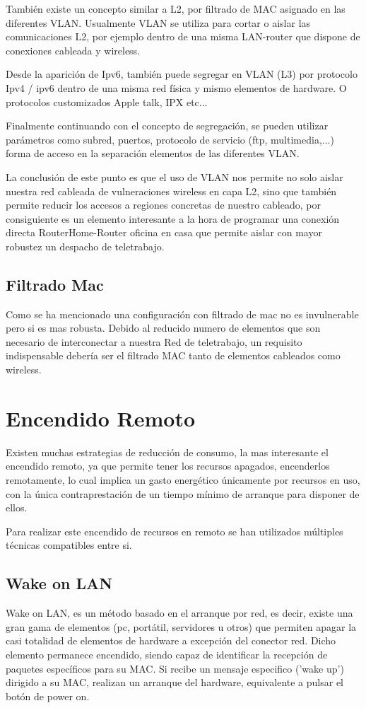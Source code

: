 También existe un concepto similar a L2, por filtrado de MAC asignado en las diferentes VLAN. Usualmente VLAN se utiliza para cortar o aislar las comunicaciones L2, por ejemplo dentro de una misma LAN-router que dispone de conexiones cableada y wireless.

Desde la aparición de Ipv6, también puede segregar en VLAN (L3) por protocolo Ipv4 / ipv6 dentro de una misma red física y mismo elementos de hardware. O protocolos customizados Apple talk, IPX etc...

Finalmente continuando con el concepto de segregación, se pueden utilizar parámetros como subred, puertos, protocolo de servicio (ftp, multimedia,...) forma de acceso en la separación elementos de las diferentes VLAN. 

La conclusión de este punto es que el uso de VLAN nos permite no solo aislar nuestra red cableada de vulneraciones wireless en capa L2, sino que también permite reducir los accesos a regiones concretas de nuestro cableado, por consiguiente es un elemento interesante a la hora de programar una conexión directa RouterHome-Router oficina en casa que permite aislar con mayor robustez un despacho de teletrabajo.

\subsection{Filtrado Mac}\label{S:vlan}
Como se ha mencionado una configuración con filtrado de mac no es invulnerable pero si es mas robusta. Debido al reducido numero de elementos que son necesario de interconectar a nuestra Red de teletrabajo, un requisito indispensable debería ser el filtrado MAC tanto de elementos cableados como wireless.

\section{Encendido Remoto}
Existen muchas estrategias de reducción de consumo, la mas interesante el encendido remoto, ya que permite tener los recursos apagados, encenderlos remotamente, lo cual implica un gasto energético únicamente por recursos en uso, con la única contraprestación de un tiempo mínimo de arranque para disponer de ellos.

Para realizar este encendido de recursos en remoto se han utilizados múltiples técnicas compatibles entre si.

\subsection{Wake on LAN}\label{S:wake_on_lan}
Wake on LAN, es un método basado en el arranque por red, es decir,  existe una gran gama de elementos (pc, portátil, servidores u otros) que permiten apagar la casi totalidad de elementos de hardware a excepción del conector red. Dicho elemento permanece encendido, siendo capaz de identificar la recepción de paquetes específicos para su MAC. Si recibe un mensaje especifico ('wake up') dirigido a su MAC, realizan un arranque del hardware, equivalente a pulsar el botón de power on.

